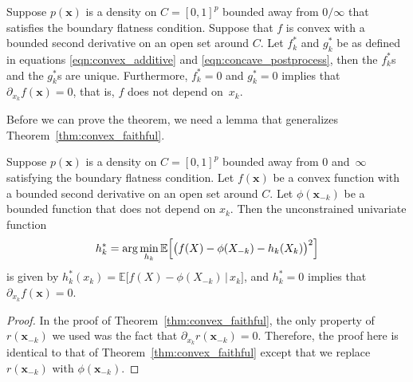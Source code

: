 \begin{theorem}
\label{thm:acdc_faithful}
Suppose $p(\mathbf{x})$ is a density on $C=[0,1]^p$ bounded away from
$0/\infty$ that satisfies the boundary flatness condition. Suppose
that $f$ is convex with a bounded second derivative on an open set
around $C$. Let $f^*_k$ and $g^*_k$ be as defined in equations
\eqref{eqn:convex_additive} and \eqref{eqn:concave_postprocess}, then
the $f^*_k$s and the $g^*_k$s are unique. Furthermore, $f^*_k = 0$
and $g^*_k = 0$ implies that $\partial_{x_k} f(\mathbf{x}) = 0$, that
is, $f$ does not depend on~$x_k$.
\end{theorem}

Before we can prove the theorem, we need a lemma that generalizes Theorem~\ref{thm:convex_faithful}.

\begin{lemma}
\label{cor:faithfulness_extension}
Suppose $p(\mathbf{x})$ is a density on $C=[0,1]^p$ bounded away from
$0$ and~$\infty$ satisfying the boundary flatness condition.  Let
$f(\mathbf{x})$ be a convex function with a bounded second derivative
on an open set around $C$. Let $\phi(\mathbf{x}_{-k})$ be a bounded
function that does not depend on $x_k$. Then the
unconstrained univariate function
 \begin{align}
h^*_k = \arg\min_{h_k} \mathbb{E} \Bigl[\bigl( f(X) 
           - \phi(X_{-k}) - h_k(X_k) \bigr)^2\Bigr]
\end{align}
is given by $h^*_k(x_k) = \mathbb{E}\bigl[ f(X) - \phi(X_{-k}) \,|\, x_k\bigr]$,
and $ h^*_k = 0$ implies that $\partial_{x_k} f(\mathbf{x}) = 0$.
\end{lemma}

\begin{proof}
  In the proof of Theorem~\ref{thm:convex_faithful}, the only property
  of $r(\mathbf{x}_{-k})$ we used was the fact that $\partial_{x_k}
  r(\mathbf{x}_{-k}) = 0$. Therefore, the proof here is identical to
  that of Theorem~\ref{thm:convex_faithful} except that we replace $r(\mathbf{x}_{-k})$ with $\phi(\mathbf{x}_{-k})$.
\end{proof}


